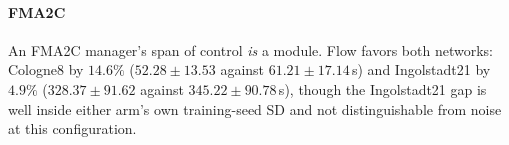 \documentclass[journal]{IEEEtran}
\theoremstyle{definition}
\begin{document}
\paragraph{FMA2C}
An FMA2C manager's span of control \emph{is} a module. Flow favors both networks: Cologne8 by $14.6\%$ ($52.28\pm13.53$ against $61.21\pm17.14$\,s) and Ingolstadt21 by $4.9\%$ ($328.37\pm91.62$ against $345.22\pm90.78$\,s), though the Ingolstadt21 gap is well inside either arm's own training-seed SD and not distinguishable from noise at this configuration.

%
%
\end{document}

